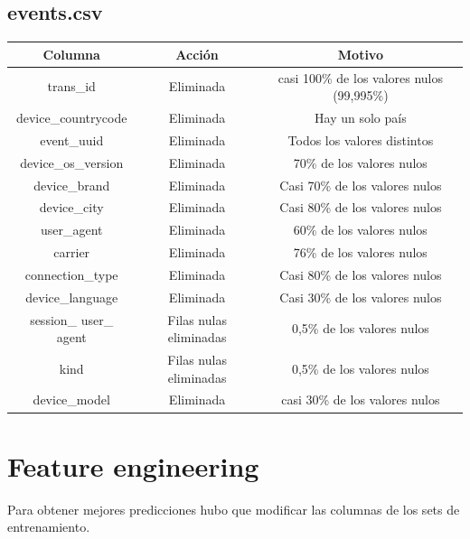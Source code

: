 \documentclass[a4paper, 12pt]{article}
\begin{document}
\subsection{events.csv}
\FloatBarrier
\begin{center}
        \begin{tabular}{ |c|c|c| }
          \hline
          Columna & Acción & Motivo \\
          \hline\hline
          trans\_id & Eliminada & casi 100\% de los valores nulos (99,995\%) \\
          \hline
          device\_countrycode & Eliminada & Hay un solo país \\
          \hline
          event\_uuid & Eliminada & Todos los valores distintos \\
          \hline
          device\_os\_version & Eliminada & 70\% de los valores nulos \\
          \hline
          device\_brand & Eliminada & Casi 70\% de los valores nulos \\
          \hline
          device\_city & Eliminada & Casi 80\% de los valores nulos \\
          \hline
          user\_agent & Eliminada & 60\% de los valores nulos \\
          \hline
          carrier & Eliminada & 76\% de los valores nulos \\
          \hline
          connection\_type & Eliminada & Casi 80\% de los valores nulos \\
          \hline
          device\_language & Eliminada & Casi 30\% de los valores nulos \\
          \hline
          session\_ user\_ agent & Filas nulas eliminadas & 0,5\% de los valores nulos \\
          \hline
          kind & Filas nulas eliminadas & 0,5\% de los valores nulos \\
          \hline
          device\_model & Eliminada & casi 30\% de los valores nulos \\
          \hline
        \end{tabular}
\end{center}
\FloatBarrier

\section{Feature engineering}

Para obtener mejores predicciones hubo que modificar las columnas de los sets de entrenamiento.
\end{document}
